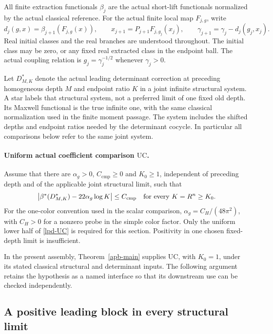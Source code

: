 \documentclass[11pt]{article}
\theoremstyle{remark}
\begin{document}
All finite extraction functionals \(\beta_j\) are the actual
short-lift functionals normalized by the actual classical reference.
For the actual finite local map \(F_{j,g}\), write
\begin{equation}
 d_j(g,x)=\beta_{j+1}(F_{j,g}(x)),\qquad
 x_{j+1}=P_{j+1}F_{j,g_j}(x_j),\qquad
 \gamma_{j+1}=\gamma_j-d_j(g_j,x_j).
 \label{lpd-updates}
\end{equation}
Real initial classes and the real branches are understood throughout.
The initial class may be zero, or any fixed real extracted class in
the endpoint ball. The actual coupling relation is
\(g_j=\gamma_j^{-1/2}\) whenever \(\gamma_j>0\).

Let \(D_{M,K}^{*}\) denote the actual leading determinant correction
at preceding homogeneous depth \(M\) and endpoint ratio \(K\) in a
joint infinite structural system. A star labels that structural
system, not a preferred limit of one fixed old depth. Its Maxwell
functional is the true infinite one, with the same classical
normalization used in the finite moment passage. The system includes
the shifted depths and endpoint ratios needed by the determinant
cocycle. In particular all comparisons below refer to the same
joint system.

\paragraph{Uniform actual coefficient comparison \(\mathrm{UC}\).}
Assume that there are \(\alpha_g>0\), \(C_{\mathrm{cmp}}\ge0\)
and \(K_0\ge1\), independent of preceding depth and of the applicable
joint structural limit, such that
\begin{equation}
 \left|\beta^{*}(D_{M,K}^{*})
                  -22\alpha_g\log K\right|
       \le C_{\mathrm{cmp}}
 \quad\hbox{for every }K=R^n\ge K_0.
 \label{lpd-UC}
\end{equation}
For the one-color convention used in the scalar comparison,
\(\alpha_g=C_H/(48\pi^2)\), with \(C_H>0\) for a nonzero probe
in the simple color factor. Only the uniform lower half of
\eqref{lpd-UC} is required for this section. Positivity in one
chosen fixed-depth limit is insufficient.

In the present assembly, Theorem~\ref{apb-main} supplies
\(\mathrm{UC}\), with \(K_0=1\), under its stated classical structural
and determinant inputs. The following argument retains the hypothesis
as a named interface so that its downstream use can be checked
independently.

\subsection{A positive leading block in every structural limit}
\label{lpd-leading-block}
\end{document}
